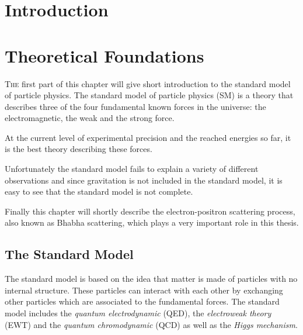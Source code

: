 \documentclass[a4paper,11pt,twosided,final,german,openbib,pdftex,listof=totoc,bibliography=totoc]{scrbook}
\begin{document}
\renewcommand\contentsname{Contents}
\renewcommand\figurename{Figure}
\renewcommand\tablename{Table}
\tableofcontents
\clearpage

\mainmatter
\sloppy

\chapter{Introduction}
\label{sec:Introduction}



\chapter{Theoretical Foundations}
\label{cha:SM}

\lettrine{T}{he} first part of this chapter will give  short introduction to the standard model of particle physics. The standard model of particle physics (SM) is a theory that describes three of the four fundamental known forces in the universe: the electromagnetic, the weak and the strong force. 

 At the current level of experimental precision and the reached energies so far, it is the best theory describing these forces.
 
 Unfortunately the standard model fails to explain a variety of different observations and since gravitation is not included in the standard model, it is easy to see that the standard model is not complete.
 
 
 Finally this chapter will shortly describe the electron-positron scattering process, also known as Bhabha scattering, which plays a very important role in this thesis.
 
 
\section{The Standard Model}
\label{sec:SM}

The standard model is based on the idea that matter is made of particles with no internal structure. These particles can interact with each other by exchanging other particles which are associated to the fundamental forces. The standard model includes the \textit{quantum electrodynamic} (QED), the \textit{electroweak theory} (EWT) and the \textit{quantum chromodynamic} (QCD) as well as the \textit{Higgs mechanism}.\\
\end{document}
